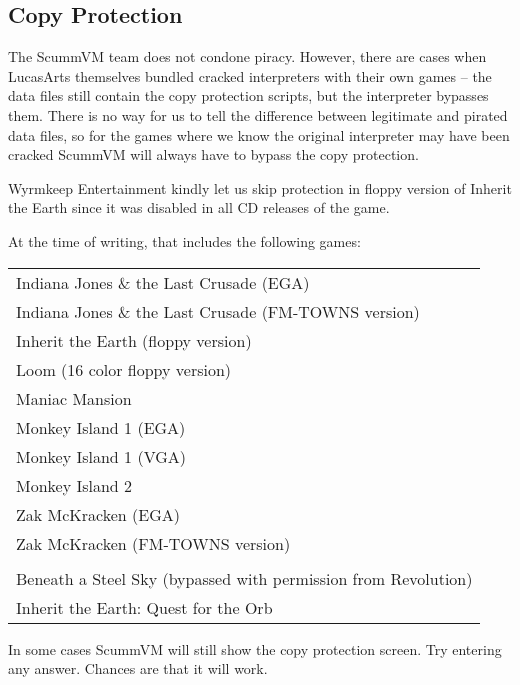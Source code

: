 \subsection{Copy Protection}

The ScummVM team does not condone piracy. However, there are cases when
LucasArts themselves bundled cracked interpreters with their own games --
the data files still contain the copy protection scripts, but the interpreter
bypasses them. There is no way for us to tell the difference between legitimate
and pirated data files, so for the games where we know the original interpreter
may have been cracked ScummVM will always have to bypass the copy protection.

Wyrmkeep Entertainment kindly let us skip protection in floppy version of
Inherit the Earth since it was disabled in all CD releases of the game.

At the time of writing, that includes the following games:

\begin{tabular}{l}
Indiana Jones \& the Last Crusade (EGA)\\
Indiana Jones \& the Last Crusade (FM-TOWNS version)\\
Inherit the Earth (floppy version)\\
Loom (16 color floppy version)\\
Maniac Mansion\\
Monkey Island 1 (EGA)\\
Monkey Island 1 (VGA)\\
Monkey Island 2\\
Zak McKracken (EGA)\\
Zak McKracken (FM-TOWNS version)\\
\\
Beneath a Steel Sky (bypassed with permission from Revolution)\\
Inherit the Earth: Quest for the Orb
\end{tabular}

In some cases ScummVM will still show the copy protection screen. Try entering
any answer. Chances are that it will work.
